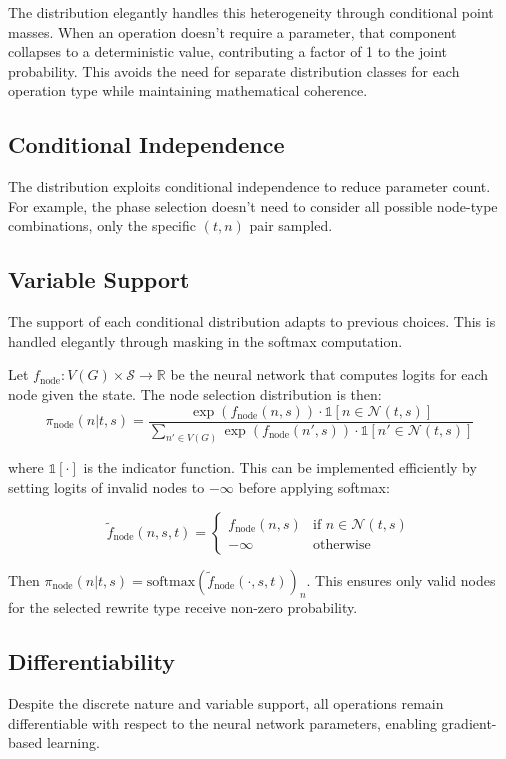 \documentclass[11pt,a4paper]{article}
\newcommand{\cS}{\mathcal{S}}
\newcommand{\cN}{\mathcal{N}}
\begin{document}
The distribution elegantly handles this heterogeneity through conditional point masses. When an operation doesn't require a parameter, that component collapses to a deterministic value, contributing a factor of 1 to the joint probability. This avoids the need for separate distribution classes for each operation type while maintaining mathematical coherence.

\subsection{Conditional Independence}
The distribution exploits conditional independence to reduce parameter count. For example, the phase selection doesn't need to consider all possible node-type combinations, only the specific $(t,n)$ pair sampled.

\subsection{Variable Support}
The support of each conditional distribution adapts to previous choices. This is handled elegantly through masking in the softmax computation.

Let $f_{\text{node}}: V(G) \times \cS \to \mathbb{R}$ be the neural network that computes logits for each node given the state. The node selection distribution is then:
\[
\pi_{\text{node}}(n|t,s) = \frac{\exp(f_{\text{node}}(n,s)) \cdot \mathbb{1}[n \in \cN(t,s)]}{\sum_{n' \in V(G)} \exp(f_{\text{node}}(n',s)) \cdot \mathbb{1}[n' \in \cN(t,s)]}
\]

where $\mathbb{1}[\cdot]$ is the indicator function. This can be implemented efficiently by setting logits of invalid nodes to $-\infty$ before applying softmax:

\[
\tilde{f}_{\text{node}}(n,s,t) = \begin{cases}
f_{\text{node}}(n,s) & \text{if } n \in \cN(t,s) \\
-\infty & \text{otherwise}
\end{cases}
\]

Then $\pi_{\text{node}}(n|t,s) = \text{softmax}(\tilde{f}_{\text{node}}(\cdot,s,t))_n$. This ensures only valid nodes for the selected rewrite type receive non-zero probability.

\subsection{Differentiability}
Despite the discrete nature and variable support, all operations remain differentiable with respect to the neural network parameters, enabling gradient-based learning.
\end{document}

